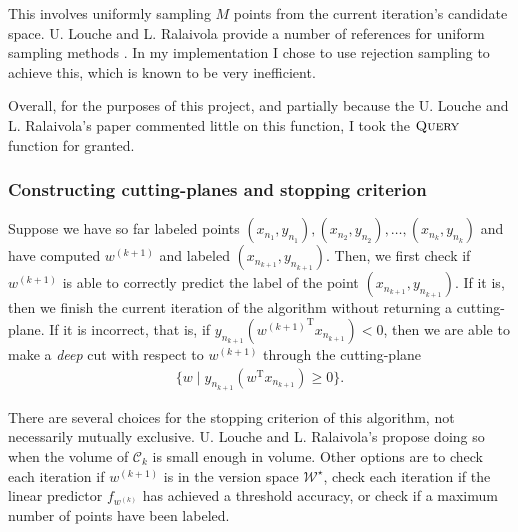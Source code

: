 \documentclass[11pt]{amsart}
\theoremstyle{definition}
\theoremstyle{remark}
\newcommand{\transpose}{\text{T}}
\begin{document}
            This involves uniformly sampling $M$ points from the current iteration's candidate space. U. Louche and L. Ralaivola provide a number of references for uniform sampling methods \cite[Section III.D]{LR15}. In my implementation I chose to use rejection sampling to achieve this, which is known to be very inefficient. 
        
            Overall, for the purposes of this project, and partially because the U. Louche and L. Ralaivola's paper \cite[Section III.D]{LR15} commented little on this function, I took the $\textsc{Query}$ function for granted. 

            \subsubsection*{Constructing cutting-planes and stopping criterion} Suppose we have so far labeled points $(x_{n_1}, y_{n_1}), (x_{n_2}, y_{n_2}), \dots, (x_{n_{k}}, y_{n_{k}})$ and have computed $w^{(k+1)}$ and labeled $(x_{n_{k+1}}, y_{n_{k+1}})$. Then, we first check if $w^{(k+1)}$ is able to correctly predict the label of the point $(x_{n_{k+1}}, y_{n_{k+1}})$. If it is, then we finish the current iteration of the algorithm without returning a cutting-plane. If it is incorrect, that is, if $y_{n_{k+1}} ({w^{(k+1)}}^\transpose x_{n_{k+1}}) < 0$, then we are able to make a \emph{deep} cut with respect to $w^{(k+1)}$ through the cutting-plane
            \begin{align*}
                \{w \;|\; y_{n_{k+1}} (w^\transpose x_{n_{k+1}}) \geq 0\}.
            \end{align*}

            There are several choices for the stopping criterion of this algorithm, not necessarily mutually exclusive. U. Louche and L. Ralaivola's \cite[Section III.D]{LR15} propose doing so when the volume of $\mathcal{C}_k$ is small enough in volume. Other options are to check each iteration if $w^{(k+1)}$ is in the version space $\mathcal{W}^\star$, check each iteration if the linear predictor $f_{w^{(k)}}$ has achieved a threshold accuracy, or check if a maximum number of points have been labeled.
\end{document}
